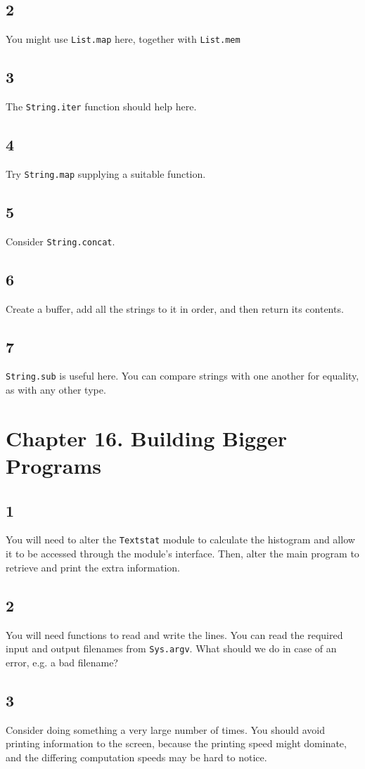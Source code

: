 \documentclass[]{book}
\begin{document}
\subsection*{2}You might use \texttt{List.map} here, together with \texttt{List.mem}
\subsection*{3}The \texttt{String.iter} function should help here.
\subsection*{4}Try \texttt{String.map} supplying a suitable function.
\subsection*{5}Consider \texttt{String.concat}.
\subsection*{6}Create a buffer, add all the strings to it in order, and then return its contents.
\subsection*{7}\texttt{String.sub} is useful here. You can compare strings with one another for equality, as with any other type.

\section*{Chapter 16. Building Bigger Programs}

\subsection*{1}
You will need to alter the \texttt{Textstat} module to calculate the histogram and allow it to be accessed through the module's interface. Then, alter the main program to retrieve and print the extra information.

\subsection*{2}
You will need functions to read and write the lines. You can read the required input and output filenames from \texttt{Sys.argv}. What should we do in case of an error, e.g. a bad filename?

\subsection*{3}
Consider doing something a very large number of times. You should avoid printing information to the screen, because the printing speed might dominate, and the differing computation speeds may be hard to notice.
\end{document}
